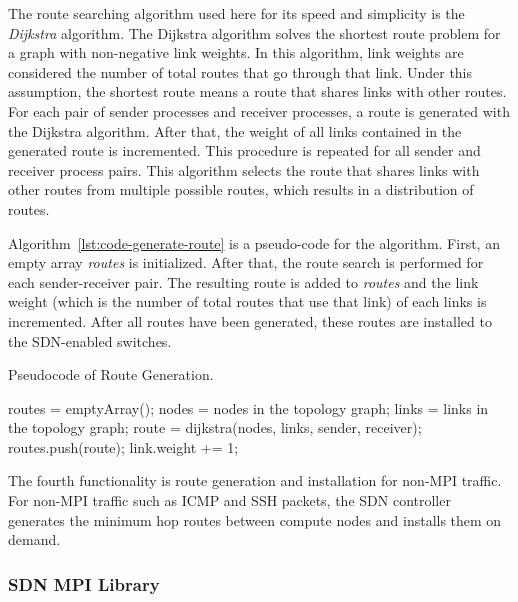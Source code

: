 The route searching algorithm used here for its speed and simplicity is the
\emph{Dijkstra} algorithm. The Dijkstra algorithm solves the shortest route
problem for a graph with non-negative link weights. In this algorithm, link
weights are considered the number of total routes that go through that link.
Under this assumption, the shortest route means a route that shares links with
other routes. For each pair of sender processes and receiver processes, a
route is generated with the Dijkstra algorithm. After that, the weight of all
links contained in the generated route is incremented. This procedure is
repeated for all sender and receiver process pairs. This algorithm selects the
route that shares links with other routes from multiple possible routes, which
results in a distribution of routes.

Algorithm~\ref{lst:code-generate-route} is a pseudo-code for the algorithm.
First, an empty array \emph{routes} is initialized. After that, the
route search is performed for each sender-receiver pair. The resulting
route is added to \emph{routes} and the link weight (which is the number
of total routes that use that link) of each links is incremented. After
all routes have been generated, these routes are installed to the
SDN-enabled switches.

\begin{algorithm}
    \caption{Pseudocode of Route Generation.}%
    \label{lst:code-generate-route}
    \begin{algorithmic}
        \STATE routes = emptyArray();
        \STATE nodes = nodes in the topology graph;
        \STATE links = links in the topology graph;
            \STATE route = dijkstra(nodes, links, sender, receiver);
            \STATE routes.push(route);
                \STATE link.weight += 1;
            \ENDFOR
        \ENDFOR
    \end{algorithmic}
\end{algorithm}

The fourth functionality is route generation and installation for
non-MPI traffic. For non-MPI traffic such as ICMP and SSH packets, the
SDN controller generates the minimum hop routes between compute nodes
and installs them on demand.

\subsubsection{SDN MPI Library}

